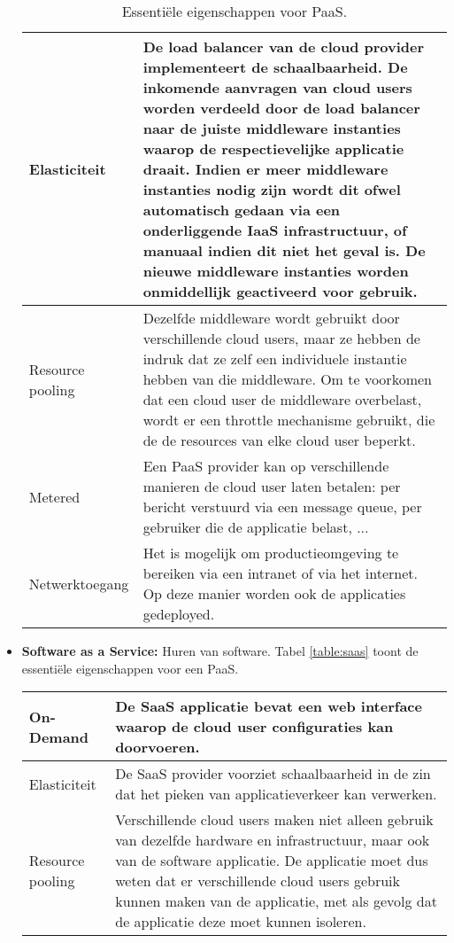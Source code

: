 \begin{itemize}
\begin{table}[ht]
\begin{tabular}{l | p{}}
				\hline
				Elasticiteit & De load balancer van de cloud provider implementeert de schaalbaarheid. De inkomende aanvragen van cloud users worden verdeeld door de load balancer naar de juiste middleware instanties waarop de respectievelijke applicatie draait. Indien er meer middleware instanties nodig zijn wordt dit ofwel automatisch gedaan via een onderliggende IaaS infrastructuur, of manuaal indien dit niet het geval is. De nieuwe middleware instanties worden onmiddellijk geactiveerd voor gebruik.\\
				\hline
				Resource pooling & Dezelfde middleware wordt gebruikt door verschillende cloud users, maar ze hebben de indruk dat ze zelf een individuele instantie hebben van die middleware. Om te voorkomen dat een cloud user de middleware overbelast, wordt er een throttle mechanisme gebruikt, die de de resources van elke cloud user beperkt. \\
				\hline
				Metered & Een PaaS provider kan op verschillende manieren de cloud user laten betalen: per bericht verstuurd via een message queue, per gebruiker die de applicatie belast, ... \\
				\hline
				Netwerktoegang & Het is mogelijk om productieomgeving te bereiken via een intranet of via het internet. Op deze manier worden ook de applicaties gedeployed.\\
				\hline
			\end{tabular}
			\caption{Essentiële eigenschappen voor PaaS.}
			\label{table:paas}
		\end{table}
		\item  \textbf{Software as a Service:} Huren van software. Tabel \ref{table:saas} toont de essentiële eigenschappen voor een PaaS. 
				\begin{table}[ht]
			\centering
			\begin{tabular}{l | p{}}
				\hline
				On-Demand & De SaaS applicatie bevat een web interface waarop de cloud user configuraties kan doorvoeren. \\
				\hline
				Elasticiteit & De SaaS provider voorziet schaalbaarheid in de zin dat het pieken van applicatieverkeer kan verwerken.\\
				\hline
				Resource pooling & Verschillende cloud users maken niet alleen gebruik van dezelfde hardware en infrastructuur, maar ook van de software applicatie. De applicatie moet dus weten dat er verschillende cloud users gebruik kunnen maken van de applicatie, met als gevolg dat de applicatie deze moet kunnen isoleren. \\

\end{tabular}
\end{table}
\end{itemize}

